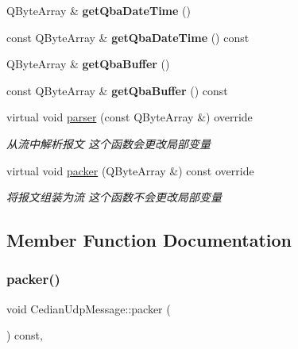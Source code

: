 \begin{DoxyCompactItemize}
Q\+Byte\+Array \& {\bfseries get\+Qba\+Date\+Time} ()
\item 
\mbox{\label{class_cedian_udp_message_ae855cd10ff51782feac4f4083b4fe262}} 
const Q\+Byte\+Array \& {\bfseries get\+Qba\+Date\+Time} () const
\item 
\mbox{\label{class_cedian_udp_message_a0f66c378eb0d1b3a11f9a9414e4b4fc1}} 
Q\+Byte\+Array \& {\bfseries get\+Qba\+Buffer} ()
\item 
\mbox{\label{class_cedian_udp_message_ad50b5c58118ff04acea0b4bde4b4343e}} 
const Q\+Byte\+Array \& {\bfseries get\+Qba\+Buffer} () const
\item 
virtual void \mbox{\hyperlink{class_cedian_udp_message_a7809bad122cec1a2eace34a9cad76f2b}{parser}} (const Q\+Byte\+Array \&) override
\begin{DoxyCompactList}\small\item\em 从流中解析报文 这个函数会更改局部变量 \end{DoxyCompactList}\item 
virtual void \mbox{\hyperlink{class_cedian_udp_message_aed165a7308447aaeba44d20aab21dc4d}{packer}} (Q\+Byte\+Array \&) const override
\begin{DoxyCompactList}\small\item\em 将报文组装为流 这个函数不会更改局部变量 \end{DoxyCompactList}\end{DoxyCompactItemize}


\subsection{Member Function Documentation}
\mbox{\label{class_cedian_udp_message_aed165a7308447aaeba44d20aab21dc4d}} 
\subsubsection{\texorpdfstring{packer()}{packer()}}
{\footnotesize\ttfamily void Cedian\+Udp\+Message\+::packer (\begin{DoxyParamCaption}\item[{Q\+Byte\+Array \&}]{ }\end{DoxyParamCaption}) const\hspace{0.3cm}{\ttfamily [override]}, {\ttfamily [virtual]}}



